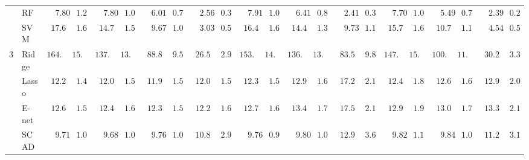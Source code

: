 \begin{tabular}{p{0.2cm}p{1cm}|p{0.6cm}p{0.6cm}|p{0.6cm}p{0.6cm}p{0.6cm}p{0.6cm}p{0.6cm}p{0.6cm}|p{0.6cm}p{0.6cm}p{0.6cm}p{0.6cm}p{0.6cm}p{0.6cm}|p{0.6cm}p{0.6cm}p{0.6cm}p{0.6cm}p{0.6cm}p{0.6cm}}
 & RF  & $\phantom{00}7.80$ & $\phantom{0}1.21$ & $\phantom{00}7.80$ & $\phantom{0}1.02$ & $\phantom{00}6.01$ & $\phantom{0}0.74$ & $\phantom{00}2.56$ & $\phantom{0}0.32$ & $\phantom{00}7.91$ & $\phantom{0}1.05$ & $\phantom{00}6.41$ & $\phantom{0}0.81$ & $\phantom{00}2.41$ & $\phantom{0}0.32$ & $\phantom{00}7.70$ & $\phantom{0}1.05$ & $\phantom{00}5.49$ & $\phantom{0}0.70$ & $\phantom{00}2.39$ & $\phantom{0}0.27$ \\
 & SVM  & $\phantom{0}17.61$ & $\phantom{0}1.69$ & $\phantom{0}14.70$ & $\phantom{0}1.50$ & $\phantom{00}9.67$ & $\phantom{0}1.07$ & $\phantom{00}3.03$ & $\phantom{0}0.50$ & $\phantom{0}16.49$ & $\phantom{0}1.64$ & $\phantom{0}14.45$ & $\phantom{0}1.39$ & $\phantom{00}9.73$ & $\phantom{0}1.15$ & $\phantom{0}15.73$ & $\phantom{0}1.65$ & $\phantom{0}10.77$ & $\phantom{0}1.14$ & $\phantom{00}4.54$ & $\phantom{0}0.54$ \\\hline
3 & Ridge  & $164.19$ & $15.99$ & $137.35$ & $13.97$ & $\phantom{0}88.81$ & $\phantom{0}9.56$ & $\phantom{0}26.52$ & $\phantom{0}2.98$ & $153.91$ & $14.22$ & $136.63$ & $13.51$ & $\phantom{0}83.56$ & $\phantom{0}9.80$ & $147.09$ & $15.34$ & $100.31$ & $11.60$ & $\phantom{0}30.21$ & $\phantom{0}3.33$ \\
 & Lasso  & $\phantom{0}12.26$ & $\phantom{0}1.45$ & $\phantom{0}12.07$ & $\phantom{0}1.55$ & $\phantom{0}11.97$ & $\phantom{0}1.51$ & $\phantom{0}12.02$ & $\phantom{0}1.58$ & $\phantom{0}12.31$ & $\phantom{0}1.53$ & $\phantom{0}12.92$ & $\phantom{0}1.60$ & $\phantom{0}17.23$ & $\phantom{0}2.16$ & $\phantom{0}12.48$ & $\phantom{0}1.80$ & $\phantom{0}12.63$ & $\phantom{0}1.61$ & $\phantom{0}12.98$ & $\phantom{0}2.05$ \\
 & E-net  & $\phantom{0}12.67$ & $\phantom{0}1.57$ & $\phantom{0}12.43$ & $\phantom{0}1.65$ & $\phantom{0}12.33$ & $\phantom{0}1.59$ & $\phantom{0}12.29$ & $\phantom{0}1.61$ & $\phantom{0}12.74$ & $\phantom{0}1.66$ & $\phantom{0}13.48$ & $\phantom{0}1.71$ & $\phantom{0}17.55$ & $\phantom{0}2.18$ & $\phantom{0}12.90$ & $\phantom{0}1.92$ & $\phantom{0}13.05$ & $\phantom{0}1.71$ & $\phantom{0}13.31$ & $\phantom{0}2.13$ \\
 & SCAD  & $\phantom{00}9.71$ & $\phantom{0}1.02$ & $\phantom{00}9.68$ & $\phantom{0}1.01$ & $\phantom{00}9.76$ & $\phantom{0}1.03$ & $\phantom{0}10.86$ & $\phantom{0}2.96$ & $\phantom{00}9.76$ & $\phantom{0}0.99$ & $\phantom{00}9.80$ & $\phantom{0}1.03$ & $\phantom{0}12.91$ & $\phantom{0}3.67$ & $\phantom{00}9.82$ & $\phantom{0}1.10$ & $\phantom{00}9.84$ & $\phantom{0}1.08$ & $\phantom{0}11.24$ & $\phantom{0}3.18$ \\

\end{tabular}
